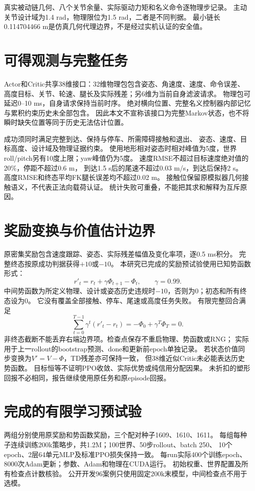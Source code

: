 \documentclass[UTF8,a4paper,11pt]{ctexart}
\begin{document}
真实被动链几何、八个关节余量、实际驱动力矩和名义命令逐物理步记录。
主动关节设计域为1.4 rad，物理限位为1.5 rad，二者是不同判据。
最小链长0.114704466 m是仿真几何代理边界，不是经过实机认证的安全值。

\section{可得观测与完整任务}
Actor和Critic共享38维接口：32维物理包包含姿态、角速度、速度、命令误差、
高度目标、关节、轮速、腿长及实际残差；另6维为当前自身滤波请求。
物理包可延迟0--10 ms，自身请求保持当前时序。
绝对横向位置、完整名义控制器内部记忆与累积约束历史未全部包含。
因此本文不宣称该接口为完整Markov状态，也不将瞬时缺失位置等同于历史无法估计位置。

成功须同时满足完整到达、保持与停车、所需障碍接触和退出、
姿态、速度、目标高度、设计域及物理证据约束。
使用地形相对姿态时相对峰值为5度，世界roll/pitch另有10度上限；yaw峰值仍为5度。
速度RMSE不超过目标速度绝对值的20\%，停距不超过0.6 m，
到达1.5 s后的尾速不超过0.03 m/s，到达后保持2 s。
高度RMSE和终态平均FK腿长误差均不超过0.02 m。
接触位保留原模拟器几何接触语义，不代表正法向载荷认证。
统计失败可重叠，不能把其求和解释为互斥原因。

\section{奖励变换与价值估计边界}
原密集奖励包含速度跟踪、姿态、实际残差幅值及变化率项，逐0.5 ms积分。
完整终态按原成功判据获得$+10$或$-10$。
本研究已完成的奖励预试验使用已知势函数形式\cite{ng,hprs}：
\begin{equation}
 r'_t=r_t+\gamma\Phi_{t+1}-\Phi_t,\qquad \gamma=0.99.
\end{equation}
中间势函数为所定义物理、设计或姿态历史违规时$-10$，否则为0；初态和所有终态设为0。
它没有覆盖全部接触、停车、尾速或高度任务失败。
有限完整回合满足
\begin{equation}
 \sum_{t=0}^{T-1}\gamma^t(r'_t-r_t)
 =-\Phi_0+\gamma^T\Phi_T=0.
\end{equation}
非终态截断不能丢弃右端边界项。检查点保存不重启物理、势函数或RNG；
实际用于上一rollout的bootstrap预测、done和更新前epoch单独记录。
若状态价值同步变换为$V'=V-\Phi$，TD残差亦可保持一致，
但38维近似Critic未必能表达历史势函数。
目标恒等不证明PPO收敛、实际优势或纯信用分配因果。
未折扣的塑形回报不必相同，报告继续使用原任务和原episode回报。

\section{完成的有限学习预试验}
两组分别使用原奖励和势函数奖励，三个配对种子1609、1610、1611。
每组每种子连续训练200k策略步，共1.2M；100世界、50步rollout、batch 250、
10个epoch、2层64单元MLP及标准PPO损失保持一致。
每run实际400个训练epoch、8000次Adam更新；参数、Adam和物理在CUDA运行。
初始权重、世界配置及所有检查点计数核验。
公开开发96案例只使用固定200k末模型，中间检查点不用于选模。
\end{document}
